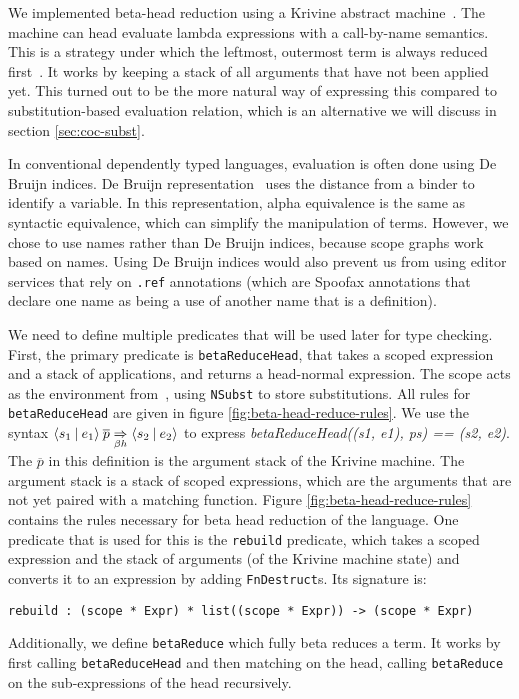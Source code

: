 We implemented beta-head reduction using a Krivine abstract machine~\cite{krivine}. The machine can head evaluate lambda expressions with a call-by-name semantics. This is a strategy under which the leftmost, outermost term is always reduced first~\cite{tapl}. It works by keeping a stack of all arguments that have not been applied yet. This turned out to be the more natural way of expressing this compared to substitution-based evaluation relation, which is an alternative we will discuss in section \ref{sec:coc-subst}.

In conventional dependently typed languages, evaluation is often done using De Bruijn indices.  De Bruijn representation~\cite[Section 6.1]{tapl} uses the distance from a binder to identify a variable. In this representation, alpha equivalence is the same as syntactic equivalence, which can simplify the manipulation of terms. However, we chose to use names rather than De Bruijn indices, because scope graphs work based on names. Using De Bruijn indices would also prevent us from using editor services that rely on \verb|.ref| annotations (which are Spoofax annotations that declare one name as being a use of another name that is a definition).

We need to define multiple predicates that will be used later for type checking. First, the primary predicate is \verb|betaReduceHead|, that takes a scoped expression and a stack of applications, and returns a head-normal expression. The scope acts as the environment from~\cite{krivine}, using \verb|NSubst| to store substitutions. All rules for \verb|betaReduceHead| are given in figure \ref{fig:beta-head-reduce-rules}. We use the syntax $\langle s_1 \: | \: e_1\rangle \: \overline{p} \underset{\beta h}{\Rightarrow} \langle s_2 \: | \: e_2\rangle$ to express \textit{betaReduceHead((s1, e1), ps) == (s2, e2)}. The $\overline{p}$ in this definition is the argument stack of the Krivine machine. The argument stack is a stack of scoped expressions, which are the arguments that are not yet paired with a matching function. Figure \ref{fig:beta-head-reduce-rules} contains the rules necessary for beta head reduction of the language. One predicate that is used for this is the \verb|rebuild| predicate, which takes a scoped expression and the stack of arguments (of the Krivine machine state) and converts it to an expression by adding \verb|FnDestruct|s. Its signature is:
\begin{lstlisting}
rebuild : (scope * Expr) * list((scope * Expr)) -> (scope * Expr)
\end{lstlisting}

Additionally, we define \verb|betaReduce| which fully beta reduces a term. It works by first calling \verb|betaReduceHead| and then matching on the head, calling \verb|betaReduce| on the sub-expressions of the head recursively.

